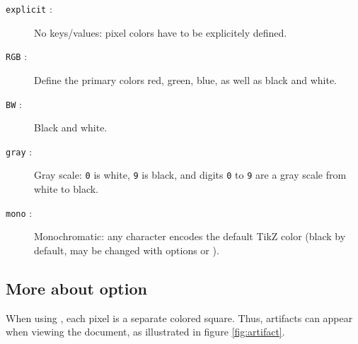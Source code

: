 \documentclass[
  load-preamble-,
  babel-options=english,
  add-index=true,
]{cnltx-doc}
\begin{document}
\begin{description}
  \item[\texttt{explicit} :] No keys/values: pixel colors have to be explicitely defined.
    \begin{sourcecode}
    \end{sourcecode}

  \item[\texttt{RGB} :] Define the primary colors red, green, blue, as well as black and white.
    \begin{sourcecode}
    \end{sourcecode}

  \item[\texttt{BW} :] Black and white.
    \begin{sourcecode}
    \end{sourcecode}

  \item[\texttt{gray} :] Gray scale: \texttt{0} is white, \texttt{9} is black, and digits \texttt{0} to \texttt{9} are a gray scale from white to black.
    \begin{sourcecode}
    \end{sourcecode}

  \item[\texttt{mono} :] Monochromatic: any character encodes the default TikZ color (black by default, may be changed with options  or ).
      \begin{sourcecode}
      \end{sourcecode}
\end{description}

\subsection{More about option }
\label{sec:squares}

When using , each pixel is a separate colored square. Thus, artifacts can appear when viewing the document, as illustrated in figure \ref{fig:artifact}.
\end{document}
